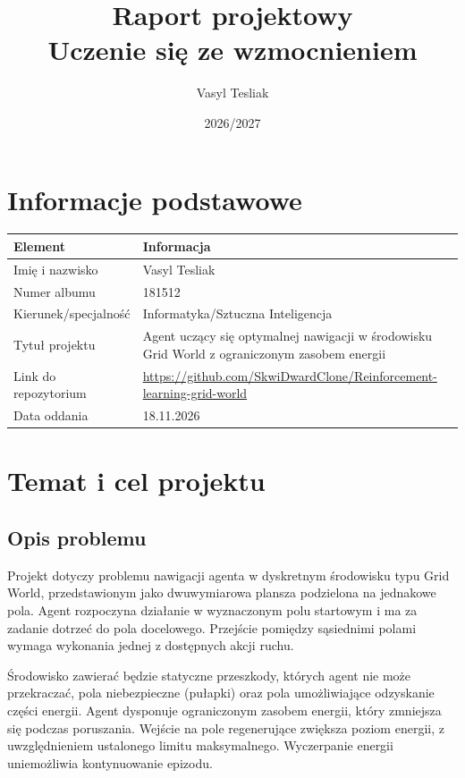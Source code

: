 \documentclass[12pt]{article}
\title{Raport projektowy\\Uczenie się ze wzmocnieniem}
\author{Vasyl Tesliak}
\date{2026/2027}
\begin{document}
\maketitle
\tableofcontents
\newpage

\section{Informacje podstawowe}

\begin{center}
\begin{tabular}{p{}p{}}
\toprule
Element & Informacja \\
\midrule
Imię i nazwisko & Vasyl Tesliak \\
Numer albumu & 181512 \\
Kierunek/specjalność & Informatyka/Sztuczna Inteligencja \\
Tytuł projektu & Agent uczący się optymalnej nawigacji w środowisku Grid World z ograniczonym zasobem energii \\
Link do repozytorium & \url{https://github.com/SkwiDwardClone/Reinforcement-learning-grid-world} \\
Data oddania & 18.11.2026 \\
\bottomrule
\end{tabular}
\end{center}

\section{Temat i cel projektu}

\subsection{Opis problemu}

Projekt dotyczy problemu nawigacji agenta w dyskretnym środowisku typu Grid World, przedstawionym jako dwuwymiarowa plansza podzielona na jednakowe pola. Agent rozpoczyna działanie w wyznaczonym polu startowym i ma za zadanie dotrzeć do pola docelowego. Przejście pomiędzy sąsiednimi polami wymaga wykonania jednej z dostępnych akcji ruchu.

Środowisko zawierać będzie statyczne przeszkody, których agent nie może przekraczać, pola niebezpieczne (pułapki) oraz pola umożliwiające odzyskanie części energii. Agent dysponuje ograniczonym zasobem energii, który zmniejsza się podczas poruszania. Wejście na pole regenerujące zwiększa poziom energii, z uwzględnieniem ustalonego limitu maksymalnego. Wyczerpanie energii uniemożliwia kontynuowanie epizodu.
\end{document}
